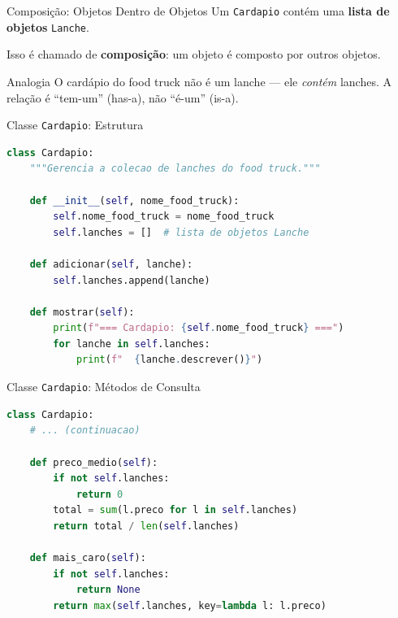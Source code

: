 \documentclass[aspectratio=169]{beamer}
\begin{document}
\begin{frame}{Composição: Objetos Dentro de Objetos}
  Um \texttt{Cardapio} contém uma \textbf{lista de objetos}
  \texttt{Lanche}.

  \vspace{0.3cm}
  Isso é chamado de \textbf{composição}: um objeto é composto
  por outros objetos.

  \vspace{0.3cm}
  \begin{block}{Analogia}
    O cardápio do food truck não é um lanche --- ele \emph{contém}
    lanches. A relação é ``tem-um'' (has-a), não ``é-um'' (is-a).
  \end{block}
\end{frame}

\begin{frame}{Classe \texttt{Cardapio}: Estrutura}
  \begin{lstlisting}[language=Python]
class Cardapio:
    """Gerencia a colecao de lanches do food truck."""

    def __init__(self, nome_food_truck):
        self.nome_food_truck = nome_food_truck
        self.lanches = []  # lista de objetos Lanche

    def adicionar(self, lanche):
        self.lanches.append(lanche)

    def mostrar(self):
        print(f"=== Cardapio: {self.nome_food_truck} ===")
        for lanche in self.lanches:
            print(f"  {lanche.descrever()}")
  \end{lstlisting}
\end{frame}

\begin{frame}[fragile]{Classe \texttt{Cardapio}: Métodos de Consulta}
  \begin{lstlisting}[language=Python]
class Cardapio:
    # ... (continuacao)

    def preco_medio(self):
        if not self.lanches:
            return 0
        total = sum(l.preco for l in self.lanches)
        return total / len(self.lanches)

    def mais_caro(self):
        if not self.lanches:
            return None
        return max(self.lanches, key=lambda l: l.preco)
  \end{lstlisting}
\end{frame}
\end{document}
